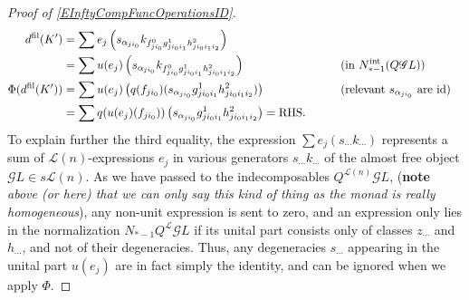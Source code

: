 \documentclass[11pt]{amsart}
\theoremstyle{plain}
\theoremstyle{definition}
\newcommand{\scrG}{\mathscr{G}}
\newcommand{\calL}{\mathcal{L}}
\theoremstyle{plain}
\newcommand{\BSW}{{\scrG}}
\newcommand{\Id}{\textup{id}}
\begin{document}
\begin{Operations in composite functor spectral sequences}
\begin{proof}[Proof of \ref{EInftyCompFuncOperationsID}]
\begin{alignat*}{2}
d^\textup{fil}(K')
&=
\sum e_j\left(s_{\alpha_{ji_0}} k_{f^0_{ji_0}g^1_{ji_0i_1}h^2_{ji_0i_1i_2}}\right)%
\\
&=
\sum u(e_j)\left(s_{\alpha_{ji_0}} k_{f^0_{ji_0}g^1_{ji_0i_1}h^2_{ji_0i_1i_2}}\right)%
&\qquad&\text{(in $N_{*-1}^\textup{int}(Q\BSW L)$)}\\
\Phi(d^\textup{fil}(K'))&=
\sum u(e_j)\left( q(f_{ji_0})(s_{\alpha_{ji_0}}g^1_{ji_0i_1}h^2_{ji_0i_1i_2})\right)%
&\qquad&\text{(relevant $s_{\alpha_{ji_0}}$ are $\Id$)}\\
&=
\sum q(u(e_j)(f_{ji_0}))\left(s_{\alpha_{ji_0}} {g^1_{ji_0i_1}h^2_{ji_0i_1i_2}}\right) =\textup{RHS}.
\end{alignat*}
To explain further the third equality,  the expression $\sum e_j(s_{\cdots }k_{\cdots })$ represents a sum of $\calL(n)$-expressions $e_j$ in various generators $s_{\cdots }k_{\cdots }$ of the almost free object $\BSW L\in s\calL(n)$. As we have passed to the indecomposables $Q^{\calL(n)}\BSW L$, (\textbf{note}\emph{ above (or here) that we can only say this kind of thing as the monad is really homogeneous}), any non-unit expression is sent to zero, and an expression only lies in the normalization $N_{*-1}Q^{\calL}\BSW L$ if its unital part consists only of classes $z_{\cdots}$ and $h_{\cdots }$, and not of their degeneracies. Thus, any degeneracies $s_{\cdots }$ appearing in the unital part $u(e_j)$ are in fact simply the identity, and can be ignored when we apply $\Phi$.
\end{proof}













\end{Operations in composite functor spectral sequences}
\end{document}
